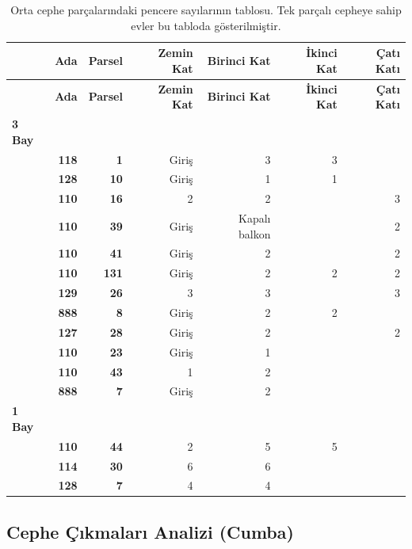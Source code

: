 \documentclass[12pt,turkish,a4paperpaper,]{report}
\begin{document}
\begin{longtable}[]{@{}lrrrrrr@{}}
\caption{Orta cephe parçalarındaki pencere sayılarının tablosu. Tek
parçalı cepheye sahip evler bu tabloda gösterilmiştir.}\tabularnewline
\toprule
& \textbf{Ada} & \textbf{Parsel} & \textbf{Zemin Kat} & \textbf{Birinci
Kat} & \textbf{İkinci Kat} & \textbf{Çatı Katı}\tabularnewline
\midrule
\endfirsthead
\toprule
& \textbf{Ada} & \textbf{Parsel} & \textbf{Zemin Kat} & \textbf{Birinci
Kat} & \textbf{İkinci Kat} & \textbf{Çatı Katı}\tabularnewline
\midrule
\endhead
\textbf{3 Bay} & & & & & &\tabularnewline
& \textbf{118} & \textbf{1} & Giriş & 3 & 3 &\tabularnewline
& \textbf{128} & \textbf{10} & Giriş & 1 & 1 &\tabularnewline
& \textbf{110} & \textbf{16} & 2 & 2 & & 3\tabularnewline
& \textbf{110} & \textbf{39} & Giriş & Kapalı balkon & &
2\tabularnewline
& \textbf{110} & \textbf{41} & Giriş & 2 & & 2\tabularnewline
& \textbf{110} & \textbf{131} & Giriş & 2 & 2 & 2\tabularnewline
& \textbf{129} & \textbf{26} & 3 & 3 & & 3\tabularnewline
& \textbf{888} & \textbf{8} & Giriş & 2 & 2 &\tabularnewline
& \textbf{127} & \textbf{28} & Giriş & 2 & & 2\tabularnewline
& \textbf{110} & \textbf{23} & Giriş & 1 & &\tabularnewline
& \textbf{110} & \textbf{43} & 1 & 2 & &\tabularnewline
& \textbf{888} & \textbf{7} & Giriş & 2 & &\tabularnewline
\textbf{1 Bay} & & & & & &\tabularnewline
& \textbf{110} & \textbf{44} & 2 & 5 & 5 &\tabularnewline
& \textbf{114} & \textbf{30} & 6 & 6 & &\tabularnewline
& \textbf{128} & \textbf{7} & 4 & 4 & &\tabularnewline
\bottomrule
\end{longtable}

\newpage

\hypertarget{cephe-uxe7ux131kmalarux131-analizi-cumba}{%
\subsection{Cephe Çıkmaları Analizi
(Cumba)}\label{cephe-uxe7ux131kmalarux131-analizi-cumba}}
\end{document}
